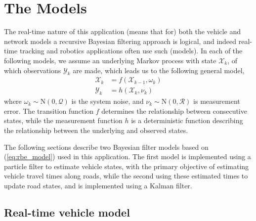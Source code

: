 \section{The Models}
\label{sec:models}

The real-time nature of this application (means that for) both
the vehicle and network models a recursive Bayesian filtering approach is logical,
and indeed real-time tracking and robotics applications often use such (models).
In each of the following models, 
we assume an underlying Markov process with state $\mathcal{X}_k$,
of which observations $\mathcal{Y}_k$ are made,
which leads us to the following general model,
\begin{equation}
\label{eq:rbe_model}
\begin{split}
\mathcal{X}_k &= f(\mathcal{X}_{k-1}, \omega_k) \\
\mathcal{Y}_k &= h(\mathcal{X}_k, \nu_k)
\end{split}
\end{equation}
where $\omega_k\sim\mathrm{N}(0,\mathcal{Q})$ is the system noise,
and $\nu_k\sim\mathrm{N}(0,\mathcal{R})$ is measurement error.
The transition function $f$ determines the relationship between consecutive states,
while the measurement function $h$ is a deterministic function describing the
relationship between the underlying and observed states.

The following sections describe two Bayesian filter models based on (\ref{eq:rbe_model}) used in this application.
The first model is implemented using a particle filter to estimate vehicle states,
with the primary objective of estimating vehicle travel times along roads,
while the second using these estimated times to update road states,
and is implemented using a Kalman filter.

\subsection{Real-time vehicle model}
\label{sec:pf}

